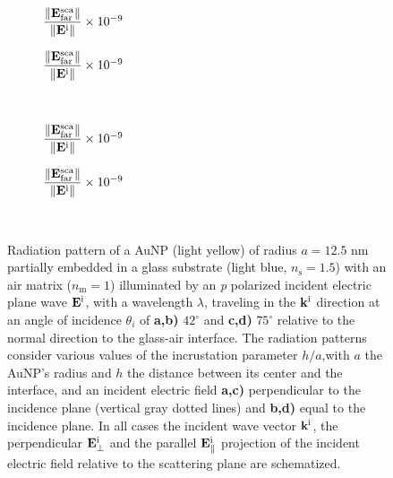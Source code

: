 \begin{figure}[h!]
    \centering
    \def\svgwidth{.8\textwidth}
    \\[-16.7em]
    \hspace*{-.2\textwidth}%
        \begin{subfigure}{.4\textwidth}\caption{%
                    \footnotesize$\dfrac{\norm{\vb{E}^\text{sca}_\text{far}}}{\norm{\vb{E}^\text{i}}} \times 10^{-9}$  }\label{sfig:Far:Inc:p2:a}\end{subfigure}%
        \begin{subfigure}{.4\textwidth}\caption{%
                    \footnotesize$\dfrac{\norm{\vb{E}^\text{sca}_\text{far}}}{\norm{\vb{E}^\text{i}}} \times 10^{-9}$  }\label{sfig:Far:Inc:p2:b}\end{subfigure}\\[13em]
    \def\svgwidth{.8\textwidth}
    \hspace*{-.21\textwidth}%
    \vspace*{-.7em}%
        \begin{subfigure}{.4\textwidth}\caption{%
                    \footnotesize$\dfrac{\norm{\vb{E}^\text{sca}_\text{far}}}{\norm{\vb{E}^\text{i}}} \times 10^{-9}$  }\label{sfig:Far:Inc:p2:c}\end{subfigure}%
        \begin{subfigure}{.4\textwidth}\caption{%
                    \footnotesize$\dfrac{\norm{\vb{E}^\text{sca}_\text{far}}}{\norm{\vb{E}^\text{i}}} \times 10^{-9}$  }\label{sfig:Far:Inc:p2:d}\end{subfigure}\\
    \caption[  Radiation pattern of a AuNP supported on a substrate illuminated at oblique incidence ]{
    Radiation pattern of a AuNP (light yellow) of radius $a = 12.5$ nm partially embedded in a glass substrate (light blue, $n_\text{s} = 1.5$) with an air matrix ($n_\text{m} = 1$) illuminated by an \textit{p} polarized incident electric plane wave $\vb{E}^\text{i}$, with a wavelength $\lambda$, traveling in the $\vb{k}^\text{i}$ direction at an angle of incidence $\theta_i$ of \textbf{a,b)} $42^\circ$ and \textbf{c,d)} $75^\circ$ relative to the normal direction to the glass-air interface. The radiation patterns consider various values of the incrustation parameter $h/a$,with $a$ the AuNP's radius and $h$ the distance between its center and the interface, and an  incident electric field \textbf{a,c)} perpendicular to the incidence plane (vertical gray dotted lines) and \textbf{b,d)} equal to the incidence plane. In all cases the incident wave vector $\vb{k}^\text{i}$, the perpendicular $\vb{E}_\perp^\text{i}$ and the  parallel $\vb{E}_\parallel^\text{i}$ projection of the incident electric field relative to the scattering plane are schematized.%
    }
    \label{fig:Far:Inc:p2}
\end{figure}

